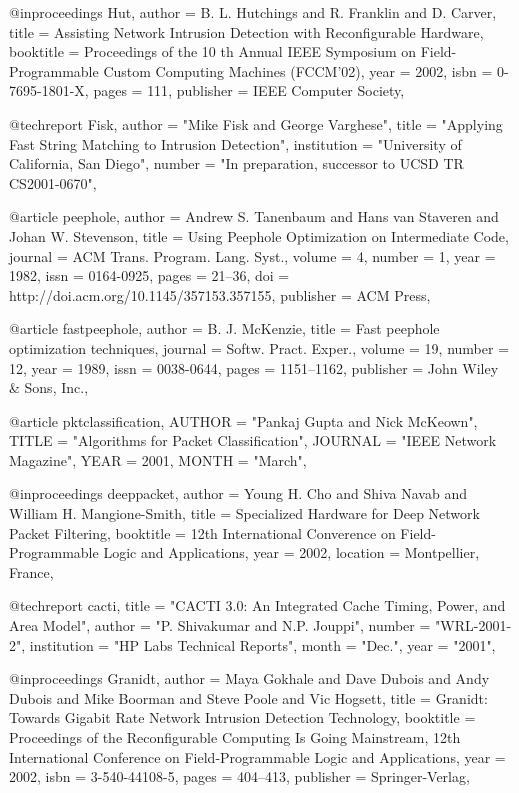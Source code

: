 @inproceedings{ Hut,
 author = {B. L. Hutchings and R. Franklin and D. Carver},
 title = {Assisting Network Intrusion Detection with Reconfigurable Hardware},
 booktitle = {Proceedings of the 10 th Annual IEEE Symposium on Field-Programmable Custom Computing Machines (FCCM'02)},
 year = {2002},
 isbn = {0-7695-1801-X},
 pages = {111},
 publisher = {IEEE Computer Society},
 }


@techreport{ Fisk,
    author = "Mike Fisk and George Varghese",
    title = "Applying Fast String Matching to Intrusion Detection",
    institution = "University of California, San Diego",
    number = "In preparation, successor to UCSD TR CS2001-0670",
}


@article{ peephole,
 author = {Andrew S. Tanenbaum and Hans van Staveren and Johan W. Stevenson},
 title = {Using Peephole Optimization on Intermediate Code},
 journal = {ACM Trans. Program. Lang. Syst.},
 volume = {4},
 number = {1},
 year = {1982},
 issn = {0164-0925},
 pages = {21--36},
 doi = {http://doi.acm.org/10.1145/357153.357155},
 publisher = {ACM Press},
 }

@article{ fastpeephole,
 author = {B. J. McKenzie},
 title = {Fast peephole optimization techniques},
 journal = {Softw. Pract. Exper.},
 volume = {19},
 number = {12},
 year = {1989},
 issn = {0038-0644},
 pages = {1151--1162},
 publisher = {John Wiley \& Sons, Inc.},
 }

@article{ pktclassification,
        AUTHOR = "Pankaj Gupta and Nick McKeown",
        TITLE = "Algorithms for Packet Classification",
        JOURNAL = "IEEE Network Magazine",
        YEAR = 2001,
        MONTH = "March",
}


@inproceedings{ deeppacket,
 author = {Young H. Cho and Shiva Navab and William H. Mangione-Smith},
 title = {Specialized Hardware for Deep Network Packet Filtering},
 booktitle = {12th International Converence on Field-Programmable Logic and Applications},
 year = {2002},
 location = {Montpellier, France},
 }

@techreport{ cacti,
 title = "{CACTI} 3.0: An Integrated Cache Timing, Power, and Area Model",
 author = "P. Shivakumar and N.P. Jouppi",
 number = "WRL-2001-2",
 institution = "HP Labs Technical Reports",
 month = "Dec.",
 year = "2001",
}

@inproceedings{ Granidt,
 author = {Maya Gokhale and Dave Dubois and Andy Dubois and Mike Boorman and Steve Poole and Vic Hogsett},
 title = {Granidt: Towards Gigabit Rate Network Intrusion Detection Technology},
 booktitle = {Proceedings of the Reconfigurable Computing Is Going Mainstream, 12th International Conference on Field-Programmable Logic and Applications},
 year = {2002},
 isbn = {3-540-44108-5},
 pages = {404--413},
 publisher = {Springer-Verlag},
 }

